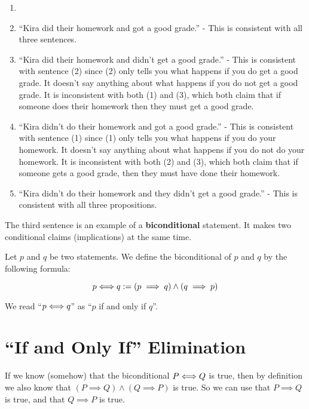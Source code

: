 \begin{solutions}
	\begin{enumerate}
		\item[] \mbox{}
		\renewcommand{\theenumi}{\alph{enumi}}
		\item ``Kira did their homework and got a good grade.'' - This is consistent with all three sentences.
		\item ``Kira did their homework and didn't get a good grade.'' - This is consistent with sentence (2) since (2) only tells you what happens if you do get a good grade.  It doesn't say anything about what happens if you do not get a good grade.  It is inconsistent with both (1) and (3), which both claim that if someone does their homework then they must get a good grade.
		\item ``Kira didn't do their homework and got a good grade.'' - This is consistent with sentence (1) since (1) only tells you what happens if you do your homework.  It doesn't say anything about what happens if you do not do your homework. It is inconsistent with both (2) and (3), which both claim that if someone gets a good grade, then they must have done their homework.
		\item ``Kira didn't do their homework and they didn't get a good grade.''  - This is consistent with all three propositions.
	\end{enumerate}
\end{solutions}

The third sentence is an example of a \textbf{biconditional} statement.  It makes two conditional claims  (implications) at the same time. 

\begin{definition}
	Let $p$ and $q$ be two statements.  We define the biconditional of $p$ and $q$ by the following formula:
	
	\[
	p \Longleftrightarrow q := (p \implies q) \wedge (q \implies p)
	\]
	
	We read ``$p \Longleftrightarrow q$'' as ``$p$ if and only if $q$''.
\end{definition}

\section{``If and Only If'' Elimination} 

If we know (somehow) that the biconditional $P \Longleftrightarrow Q$ is true, then by definition we also know that $(P \implies Q) \wedge (Q \implies P)$ is true.  So we can use that $P \implies Q$ is true, and that $Q \implies P$ is true.  


